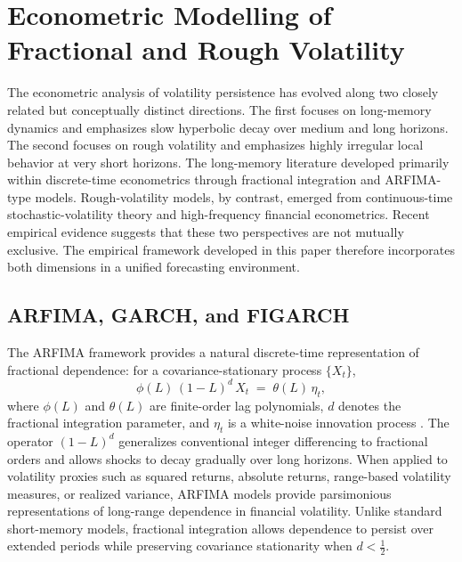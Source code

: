 \documentclass[unnumsec,webpdf,contemporary,large]{oup-authoring-template}%
\theoremstyle{thmstyleone}%
\theoremstyle{thmstyletwo}%
\theoremstyle{thmstylethree}%
\begin{document}
\section{Econometric Modelling of Fractional and Rough Volatility}
\label{sec:econometrics}

The econometric analysis of volatility persistence has evolved along two
closely related but conceptually distinct directions. The first focuses on
long-memory dynamics and emphasizes slow hyperbolic decay over medium and
long horizons. The second focuses on rough volatility and emphasizes highly
irregular local behavior at very short horizons. The long-memory literature
developed primarily within discrete-time econometrics through fractional
integration and ARFIMA-type models. Rough-volatility models, by contrast,
emerged from continuous-time stochastic-volatility theory and high-frequency
financial econometrics. Recent empirical evidence suggests that these two
perspectives are not mutually exclusive. The empirical framework developed
in this paper therefore incorporates both dimensions in a unified forecasting
environment.

\subsection{ARFIMA, GARCH, and FIGARCH}

The ARFIMA framework provides a natural discrete-time representation of fractional dependence: for a covariance-stationary process $\{X_t\}$,
\begin{equation}
  \phi(L)\, (1-L)^d\, X_t \;=\; \theta(L)\,\eta_t,
\end{equation}
where $\phi(L)$ and $\theta(L)$ are finite-order lag polynomials, $d$
denotes the fractional integration parameter, and $\eta_t$ is a white-noise
innovation process \citep{granger1980introduction,hosking1981fractional}.
The operator $(1-L)^d$ generalizes conventional integer differencing to
fractional orders and allows shocks to decay gradually over long horizons.
When applied to volatility proxies such as squared returns, absolute
returns, range-based volatility measures, or realized variance, ARFIMA
models provide parsimonious representations of long-range dependence in
financial volatility. Unlike standard short-memory models, fractional
integration allows dependence to persist over extended periods while
preserving covariance stationarity when $d<\frac{1}{2}$.
\end{document}
